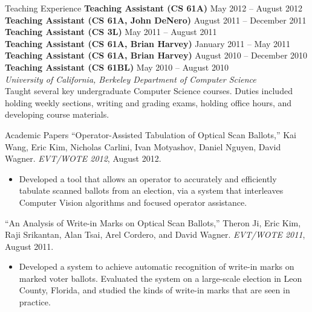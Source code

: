 \documentclass{resume}
\begin{document}
\begin{component}{Teaching Experience}
    \textbf{Teaching Assistant (CS 61A)} \hfill May 2012 -- August 2012 \\
    \textbf{Teaching Assistant (CS 61A, John DeNero)} \hfill August 2011 -- December 2011 \\
    \textbf{Teaching Assistant (CS 3L)} \hfill May 2011 -- August 2011 \\
    \textbf{Teaching Assistant (CS 61A, Brian Harvey)} \hfill January 2011 -- May 2011 \\
    \textbf{Teaching Assistant (CS 61A, Brian Harvey)} \hfill August 2010 -- December 2010 \\
    \textbf{Teaching Assistant (CS 61BL)} \hfill May 2010 -- August 2010 \\
        \textit{University of California, Berkeley \hfill Department of Computer Science}\\
    Taught several key undergraduate Computer Science courses. Duties included holding weekly sections, writing and grading exams, holding office hours, and developing course materials.
\end{component}

\begin{component}{Academic Papers}
\vspace{0.5em}
``Operator-Assisted Tabulation of Optical Scan Ballots,'' Kai Wang, Eric Kim, Nicholas Carlini, Ivan Motyashov, Daniel Nguyen, David Wagner. \emph{EVT/WOTE 2012}, August 2012.
        \begin{itemize}
        \vspace{-0.5em}\item[] Developed a tool that allows an operator
to accurately and efficiently tabulate scanned ballots from an election,
via a system that interleaves Computer Vision algorithms and focused
operator assistance.
        \end{itemize}

``An Analysis of Write-in Marks on Optical Scan Ballots,'' Theron Ji, Eric Kim, Raji Srikantan, Alan Tsai, Arel Cordero, and David Wagner. \emph{EVT/WOTE 2011}, August 2011.
	\begin{itemize}
	\vspace{-0.5em}\item[] Developed a system to achieve automatic recognition of write-in marks on marked voter ballots. Evaluated the system on
				       a large-scale election in Leon County, Florida, and studied the kinds of write-in marks that are seen in practice.
	\end{itemize}
\end{component}
\end{document}
